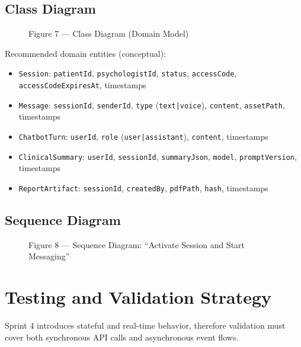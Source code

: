 \documentclass[12pt]{article}
\begin{document}
\subsection*{Class Diagram}
\begin{figure}[h]
  \centering
  \caption{Figure 7 --- Class Diagram (Domain Model)}
\end{figure}

Recommended domain entities (conceptual):
\begin{itemize}[leftmargin=*]
  \item \texttt{Session}: \texttt{patientId}, \texttt{psychologistId}, \texttt{status}, \texttt{accessCode}, \texttt{accessCodeExpiresAt}, timestamps
  \item \texttt{Message}: \texttt{sessionId}, \texttt{senderId}, \texttt{type} (\texttt{text|voice}), \texttt{content}, \texttt{assetPath}, timestamps
  \item \texttt{ChatbotTurn}: \texttt{userId}, \texttt{role} (\texttt{user|assistant}), \texttt{content}, timestamps
  \item \texttt{ClinicalSummary}: \texttt{userId}, \texttt{sessionId}, \texttt{summaryJson}, \texttt{model}, \texttt{promptVersion}, timestamps
  \item \texttt{ReportArtifact}: \texttt{sessionId}, \texttt{createdBy}, \texttt{pdfPath}, \texttt{hash}, timestamps
\end{itemize}

\subsection*{Sequence Diagram}
\begin{figure}[h]
  \centering
  \caption{Figure 8 --- Sequence Diagram: ``Activate Session and Start Messaging''}
\end{figure}

\section{Testing and Validation Strategy}
Sprint 4 introduces stateful and real-time behavior, therefore validation must cover both synchronous API calls and asynchronous event flows.
\end{document}
